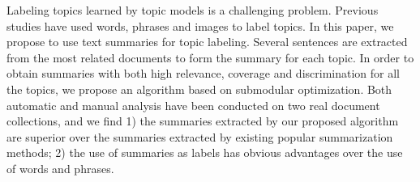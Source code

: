 Labeling topics learned by topic models is a challenging problem. Previous studies have used words, phrases and images to label topics. In this paper, we propose to use text summaries for topic labeling. Several sentences are extracted from the most related documents to form the summary for each topic. In order to obtain summaries with both high relevance, coverage and discrimination for all the topics, we propose an algorithm based on submodular optimization. Both automatic and manual analysis have been conducted on two real document collections, and we find 1) the summaries extracted by our proposed algorithm are superior over the summaries extracted by existing popular summarization methods; 2) the use of summaries as labels has obvious advantages over the use of words and phrases.
